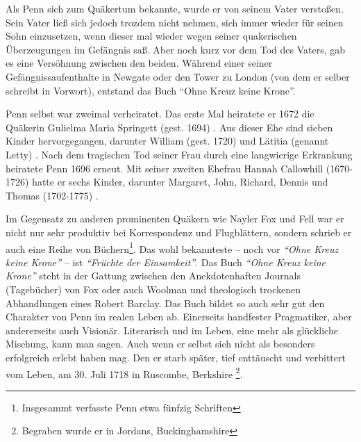 Als Penn sich zum Quäkertum bekannte, wurde er von seinem Vater verstoßen.
Sein Vater ließ sich jedoch trozdem nicht nehmen, sich immer wieder für seinen
Sohn einzusetzen, wenn dieser mal wieder
wegen seiner quakerischen Überzeugungen im Gefängnis saß. Aber noch
kurz vor dem Tod des Vaters, gab es eine Versöhnung zwischen den beiden. Während
einer seiner Gefängnissaufenthalte in Newgate  oder den Tower zu London (von dem er selber schreibt in Vorwort), entstand
das Buch "`Ohne Kreuz keine Krone"'.

\medskip

Penn selbst war zweimal verheiratet. Das erste Mal heiratete er 1672 die
Quäkerin Gulielma Maria Springett (gest. 1694)
. Aus dieser Ehe sind sieben Kinder
hervorgegangen, darunter William (gest. 1720) und Lätitia (genannt Letty)
. Nach dem tragischen Tod seiner Frau
durch eine langwierige Erkrankung heiratete Penn 1696 erneut. Mit seiner zweiten
Ehefrau Hannah Callowhill (1670-1726)  hatte
er sechs Kinder, darunter Margaret, John, Richard, Dennis und Thomas (1702-1775)
.

\medskip

Im Gegensatz zu anderen prominenten Quäkern wie Nayler  Fox und Fell war er nicht nur sehr produktiv bei Korrespondenz und
Flugblättern, sondern schrieb er auch eine Reihe von
Büchern\footnote{Insgesammt verfasste Penn etwa fünfzig Schriften}.
Das wohl bekannteste -- noch vor \textit{"`Ohne Kreuz keine Krone"'} -- ist
\textit{"`Früchte der Einsamkeit"'}. Das Buch \textit{"`Ohne Kreuz keine
Krone"'} steht in der Gattung zwischen den Anekdotenhaften Journals
(Tagebücher) von Fox
oder auch Woolman und theologisch trockenen
Abhandlungen eines Robert Barclay. Das Buch
bildet so auch sehr gut den Charakter von Penn im realen Leben ab. Einerseits
handfester Pragmatiker, aber andererseits auch Visionär. Literarisch und im Leben,
eine mehr als glückliche Mischung, kann man sagen. Auch wenn er selbst sich
nicht als besonders erfolgreich erlebt haben mag. Den er starb später, tief
enttäuscht und verbittert vom Leben, am 30. Juli 1718 in Ruscombe, Berkshire
\footnote{Begraben wurde er in
Jordans, Buckinghamshire }.

